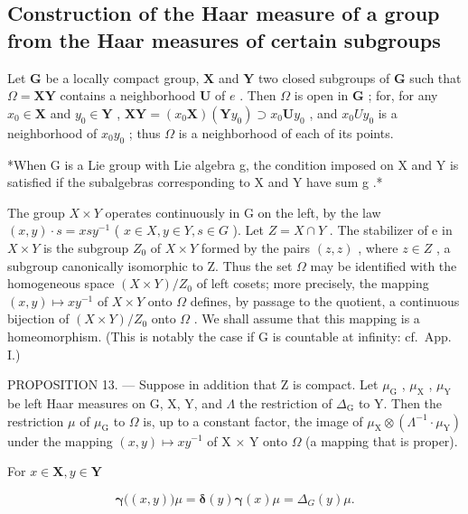\subsection{Construction of the Haar measure of a group from the Haar measures of certain subgroups}

Let \(\mathbf{G}\) be a locally compact group, \(\mathbf{X}\) and \(\mathbf{Y}\) two closed subgroups of \(\mathbf{G}\) such that \(\Omega = \mathbf{XY}\) contains a neighborhood \(\mathbf{U}\) of \(e\) . Then \(\Omega\) is open in \(\mathbf{G}\) ; for, for any \(x_0 \in \mathbf{X}\) and \(y_0 \in \mathbf{Y}\) , \(\mathbf{XY} = (x_0\mathbf{X})(\mathbf{Y}y_0) \supset x_0\mathbf{U}y_0\) , and \(x_{0}Uy_{0}\) is a neighborhood of \(x_{0}y_{0}\) ; thus \(\Omega\) is a neighborhood of each of its points.

*When G is a Lie group with Lie algebra g, the condition imposed on X and Y is satisfied if the subalgebras corresponding to X and Y have sum g .*

The group \(X \times Y\) operates continuously in G on the left, by the law \((x, y) \cdot s = xsy^{-1}\) ( \(x \in X, y \in Y, s \in G\) ). Let \(Z = X \cap Y\) . The stabilizer of e in \(X \times Y\) is the subgroup \(Z_{0}\) of \(X \times Y\) formed by the pairs \((z, z)\) , where \(z \in Z\) , a subgroup canonically isomorphic to Z. Thus the set \(\Omega\) may be identified with the homogeneous space \((X \times Y)/Z_{0}\) of left cosets; more precisely, the mapping \((x, y) \mapsto xy^{-1}\) of \(X \times Y\) onto \(\Omega\) defines, by passage to the quotient, a continuous bijection of \((X \times Y)/Z_{0}\) onto \(\Omega\) . We shall assume that this mapping is a homeomorphism. (This is notably the case if G is countable at infinity: cf.~App. I.)

PROPOSITION 13. --- Suppose in addition that Z is compact. Let \(\mu_{\mathrm{G}}\) , \(\mu_{\mathrm{X}}\) , \(\mu_{\mathrm{Y}}\) be left Haar measures on G, X, Y, and \(\Lambda\) the restriction of \(\Delta_{\mathrm{G}}\) to Y. Then the restriction \(\mu\) of \(\mu_{\mathrm{G}}\) to \(\Omega\) is, up to a constant factor, the image of \(\mu_{\mathrm{X}} \otimes (\Lambda^{-1} \cdot \mu_{\mathrm{Y}})\) under the mapping \((x, y) \mapsto xy^{-1}\) of X × Y onto \(\Omega\) (a mapping that is proper).

For \(x\in \mathbf{X},y\in \mathbf{Y}\)

\[
\boldsymbol {\gamma} \big ((x, y) \big) \mu = \boldsymbol {\delta} (y) \boldsymbol {\gamma} (x) \mu = \Delta_ {G} (y) \mu .
\]


